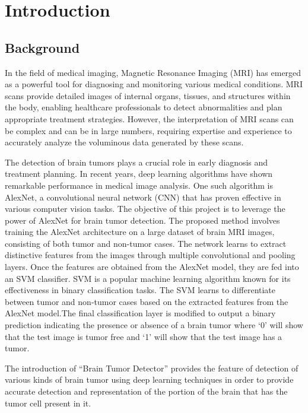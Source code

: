

\newpage
{} %

\chapter{Introduction}
\vspace{-18pt}
\section{Background}\label{sec:bkgrnd}%
\vspace{-18pt}
In the field of medical imaging, Magnetic Resonance Imaging (MRI) has emerged as a powerful tool for diagnosing and monitoring various medical conditions. MRI scans provide detailed images of internal organs, tissues, and structures within the body, enabling healthcare professionals to detect abnormalities and plan appropriate treatment strategies. However, the interpretation of MRI scans can be complex and can be in large numbers, requiring expertise and experience to accurately analyze the voluminous data generated by these scans\cite{Mirchandani}.
\par
 The detection of brain tumors plays a crucial role in early diagnosis and treatment planning. In recent years, deep learning algorithms have shown remarkable performance in medical image analysis\cite{ZainEldin2023}. One such algorithm is AlexNet, a convolutional neural network (CNN) that has proven effective in various computer vision tasks. The objective of this project is to leverage the power of AlexNet for brain tumor detection\cite{Mirchandani}. The proposed method involves training the AlexNet architecture on a large dataset of brain MRI images, consisting of both tumor and non-tumor cases. The network learns to extract distinctive features from the images through multiple convolutional and pooling layers. Once the features are obtained from the AlexNet model, they are fed into an SVM classifier. SVM is a popular machine learning algorithm known for its effectiveness in binary classification tasks\cite{Sejuti2021}. The SVM learns to differentiate between tumor and non-tumor cases based on the extracted features from the AlexNet model.The final classification layer is modified to output a binary prediction indicating the presence or absence of a brain tumor where ‘0’ will show that the test image is tumor free and ‘1’ will show that the test image has a tumor.
 \par
 The introduction of “Brain Tumor Detector” provides the feature of detection of various kinds of brain tumor using deep learning techniques in order to provide accurate detection and representation of the portion of the brain that has the tumor cell present in it.

